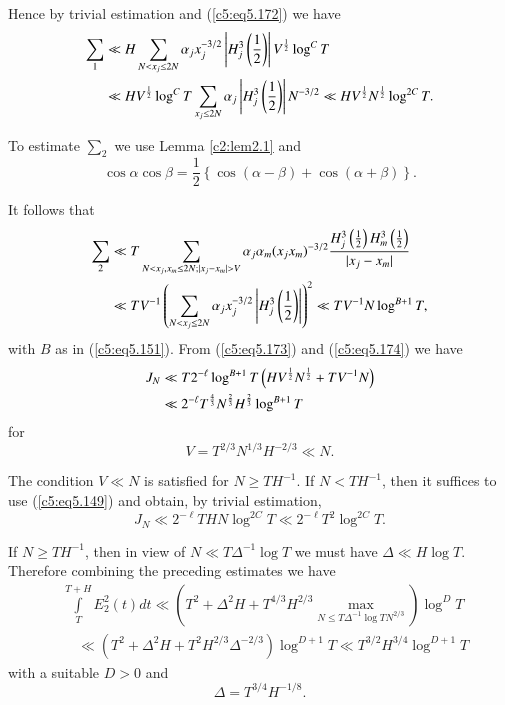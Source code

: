 Hence by trivial estimation and (\ref{c5:eq5.172}) we have 
\begin{align}
\sum_1 &\ll H \sum\limits_{N < x_j \leq 2 N} \alpha_j x^{-3/2}_j 
\left|H^3_j \left(\frac{1}{2} \right)\right| 
V^{\frac{1}{2}} \log^C T\label{c5:eq5.173}\\
& \ll HV^{\frac{1}{2}} \log^C T \sum\limits_{x_j \leq 2 N} \alpha_j
\left|H^3_j \left(\frac{1}{2} \right)\right| N^{-3/2} \ll HV^{\frac{1}{2}}
N^{\frac{1}{2}} \log^{2C} T.\notag  
\end{align}\pageoriginale

To estimate $\sum_2$ we use Lemma \ref{c2:lem2.1} and
$$ 
\cos \alpha \cos \beta = \frac{1}{2} \left\{ \cos (\alpha - \beta) +
\cos (\alpha + \beta)\right\}.  
$$

It follows that 
\begin{align}
\sum_2  & \ll T \sum_{N < x_j, x_m \leq 2 N; |x_j - x_m|>V} \alpha_j
\alpha_m (x_j x_m)^{-3/2} \frac{H^3_j \left(\frac{1}{2} \right) H^3_m
  \left(\frac{1}{2} \right)}{|x_j - x_m|}
\label{c5:eq5.174}\\ 
& \ll TV^{-1} \left( \sum\limits_{N <x_j \leq 2 N} \alpha_j x^{-3/2}_j 
\left|H^3_j \left(\frac{1}{2} \right)\right|\right)^2  \ll TV^{-1} N
\log^{B+1} T,\notag 
\end{align}
with $B$ as in (\ref{c5:eq5.151}). From (\ref{c5:eq5.173}) and
(\ref{c5:eq5.174}) we have  
\begin{align}
J_N &\ll T2^{-\ell} \log^{B+1} T \left(HV^{\frac{1}{2}} N^{\frac{1}{2}} +
TV^{-1} N\right)\notag\\
& \ll 2^{-\ell} T^{\frac{4}{3}} N^{\frac{2}{3}}
H^{\frac{2}{3}} \log^{B+1} T\label{c5:eq5.175} 
\end{align}
for 
$$
V = T^{2/3} N^{1/3} H^{-2/3} \ll N.
$$

The condition $V \ll N$ is satisfied for $N \geq TH^{-1}$. If $N <
TH^{-1}$, then it suffices to use (\ref{c5:eq5.149}) and obtain, by
trivial estimation, 
$$
J_N \ll 2^{-\ell} THN \log^{2C} T \ll 2^{-\ell} T^2 \log^{2C} T. 
$$

If $N \geq TH^{-1}$, then in view of $N \ll T\Delta^{-1} \log T$ we
must have $\Delta \ll H \log T$. Therefore combining the preceding
estimates we have 
\begin{align*}
& \int\limits^{T+H}_T E^{2}_2(t) dt \ll \left(T^2 + \Delta^2 H +
  T^{4/3} H^{2/3} \max\limits_{N \leq T \Delta^{-1} \log T N^{2/3}}
  \right) \log^D T\\ 
&\quad \ll \left(T^2 + \Delta^2 H + T^2 H^{2/3} \Delta^{-2/3}\right) 
\log^{D+1} T \ll T^{3/2} H^{3/4} \log^{D+1} T 
\end{align*}
with a suitable $D >0$ and
$$
\Delta = T^{3/4} H^{-1/8}.
$$

